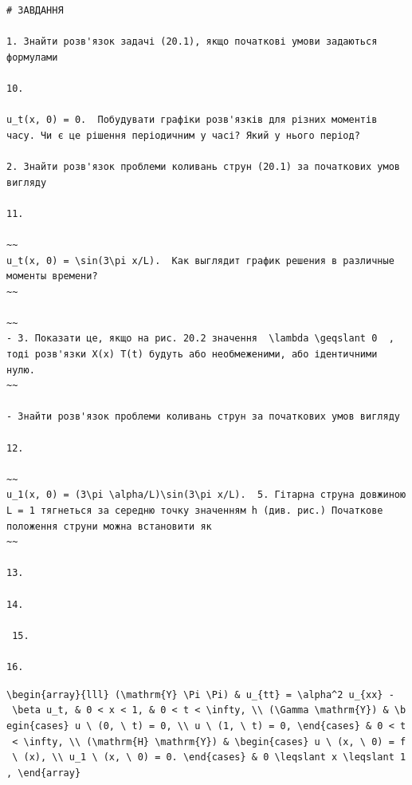 \documentclass[
  ukrainian,
]{article}
\begin{document}
\begin{verbatim}
# ЗАВДАННЯ

1. Знайти розв'язок задачі (20.1), якщо початкові умови задаються формулами

10.

u_t(x, 0) = 0.  Побудувати графіки розв'язків для різних моментів часу. Чи є це рішення періодичним у часі? Який у нього період?

2. Знайти розв'язок проблеми коливань струн (20.1) за початкових умов вигляду

11.

~~
u_t(x, 0) = \sin(3\pi x/L).  Как выглядит график решения в различные моменты времени?
~~

~~
- 3. Показати це, якщо на рис. 20.2 значення  \lambda \geqslant 0  , тоді розв'язки X(x) T(t) будуть або необмеженими, або ідентичними нулю.
~~

- Знайти розв'язок проблеми коливань струн за початкових умов вигляду

12.

~~
u_1(x, 0) = (3\pi \alpha/L)\sin(3\pi x/L).  5. Гітарна струна довжиною L = 1 тягнеться за середню точку значенням h (див. рис.) Початкове положення струни можна встановити як
~~

13.

14.

 15.

16.
\end{verbatim}

\texttt{\textbackslash{}begin\{array\}\{lll\}\ (\textbackslash{}mathrm\{Y\}\ \textbackslash{}Pi\ \textbackslash{}Pi)\ \&\ u\_\{tt\}\ =\ \textbackslash{}alpha\^{}2\ u\_\{xx\}\ -\ \textbackslash{}beta\ u\_t,\ \&\ 0\ \textless{}\ x\ \textless{}\ 1,\ \&\ 0\ \textless{}\ t\ \textless{}\ \textbackslash{}infty,\ \textbackslash{}\textbackslash{}\ (\textbackslash{}Gamma\ \textbackslash{}mathrm\{Y\})\ \&\ \textbackslash{}begin\{cases\}\ u\ \textbackslash{}\ (0,\ \textbackslash{}\ t)\ =\ 0,\ \textbackslash{}\textbackslash{}\ u\ \textbackslash{}\ (1,\ \textbackslash{}\ t)\ =\ 0,\ \textbackslash{}end\{cases\}\ \&\ 0\ \textless{}\ t\ \textless{}\ \textbackslash{}infty,\ \textbackslash{}\textbackslash{}\ (\textbackslash{}mathrm\{H\}\ \textbackslash{}mathrm\{Y\})\ \&\ \textbackslash{}begin\{cases\}\ u\ \textbackslash{}\ (x,\ \textbackslash{}\ 0)\ =\ f\ \textbackslash{}\ (x),\ \textbackslash{}\textbackslash{}\ u\_1\ \textbackslash{}\ (x,\ \textbackslash{}\ 0)\ =\ 0.\ \textbackslash{}end\{cases\}\ \&\ 0\ \textbackslash{}leqslant\ x\ \textbackslash{}leqslant\ 1,\ \textbackslash{}end\{array\}}
\end{document}
